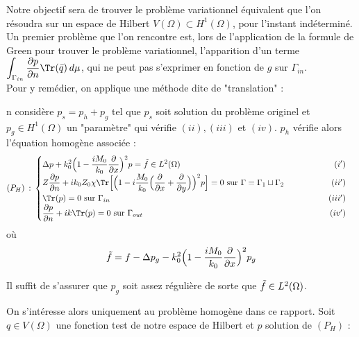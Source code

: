 Notre objectif sera de trouver le problème variationnel équivalent que l'on résoudra sur un espace de Hilbert $V(\Omega)\subset H^1(\Omega)$, pour l'instant indéterminé. \\

Un premier problème que l'on rencontre est, lors de l'application de la formule de Green pour trouver le problème variationnel, l'apparition d'un terme $\displaystyle \int_{\Gamma_{in}} \frac{\partial p}{\partial n} \Tr(\Bar{q})\hspace{2pt} d\mu$, qui ne peut pas s'exprimer en fonction de $g$ sur $\Gamma_{in}$. \\

Pour y remédier, on applique une méthode dite de "translation" :

\begin{tcolorbox}[colback=red!5!white,colframe=red!75!black,title=Proposition 4.1.1: Problème différentiel homogène]
n considère $p_s = p_h + p_g$ tel que $p_s$ soit solution du problème originel et $p_g\in H^1(\Omega)$ un "paramètre" qui vérifie $(ii),(iii)$ et $(iv)$. $p_h$ vérifie alors l'équation homogène associée :\\

\[
    (P_H) \hspace{2pt} : \hspace{2pt}
    \begin{cases}
    \displaystyle \Delta p + k_0^2\Big(1 - \frac{iM_0}{k_0}\frac{\partial}{\partial x}\Big)^2p = \Tilde{f} \in L^2(\Omega) \hfill (i')\\
    \displaystyle Z\frac{\partial p}{\partial n} + ik_0Z_0\chi \Tr \Bigl[ \Bigl(1-i \frac{M_0}{k_0} \Big(\frac{\partial}{\partial x} + \frac{\partial}{\partial y}\Big) \Bigr)^2p \Bigr] = 0$ sur $\Gamma = \Gamma_1 \sqcup \Gamma_2 \hspace*{2cm} \hfill (ii')
    \\
    \displaystyle \Tr(p) = 0 $ sur $ \Gamma_{in} \hfill (iii') \\
    \displaystyle \frac{\partial p}{\partial n} + ik \Tr(p) = 0 $ sur $\Gamma_{out} \hfill (iv')
    \end{cases} 
\]
où \[
    \displaystyle \Tilde{f} = f - \Delta p_g - k_0^2\Big(1 - \frac{iM_0}{k_0}\frac{\partial}{\partial x}\Big)^2p_g\]
\end{tcolorbox}
Il suffit de s'assurer que $p_g$ soit assez régulière de sorte que $\Tilde{f}\in L^2(\Omega)$.

On s'intéresse alors uniquement au problème homogène dans ce rapport. Soit $q\in V(\Omega)$ une fonction test de notre espace de Hilbert et $p$ solution de $(P_H)$ :

